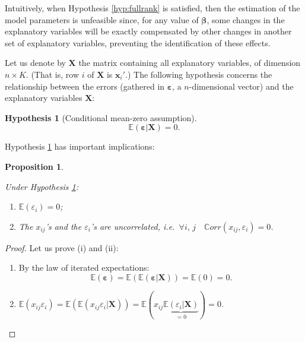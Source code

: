 \documentclass[
  12pt,
]{book}
\providecommand{\tightlist}{%
  \setlength{\itemsep}{0pt}\setlength{\parskip}{0pt}}
\newtheorem{proposition}{Proposition}[chapter]
\theoremstyle{definition}
\theoremstyle{definition}
\theoremstyle{definition}
\theoremstyle{definition}
\newtheorem{hypothesis}{Hypothesis}[chapter]
\theoremstyle{remark}
\begin{document}
Intuitively, when Hypothesis \ref{hyp:fullrank} is satisfied, then the estimation of the model parameters is unfeasible since, for any value of \(\boldsymbol\beta\), some changes in the explanatory variables will be exactly compensated by other changes in another set of explanatory variables, preventing the identification of these effects.

Let us denote by \(\mathbf{X}\) the matrix containing all explanatory variables, of dimension \(n \times K\). (That is, row \(i\) of \(\mathbf{X}\) is \(\mathbf{x}_i'\).) The following hypothesis concerns the relationship between the errors (gathered in \(\boldsymbol\varepsilon\), a \(n\)-dimensional vector) and the explanatory variables \(\mathbf{X}\):

\begin{hypothesis}[Conditional mean-zero assumption]
\protect\hypertarget{hyp:exogeneity}{}\label{hyp:exogeneity}\begin{equation}
\mathbb{E}(\boldsymbol\varepsilon|\mathbf{X}) = 0.
\end{equation}
\end{hypothesis}

Hypothesis \ref{hyp:exogeneity} has important implications:

\begin{proposition}
\protect\hypertarget{prp:implicationExog}{}\label{prp:implicationExog}

Under Hypothesis \ref{hyp:exogeneity}:

\begin{enumerate}
\def\labelenumi{\roman{enumi}.}
\tightlist
\item
  \(\mathbb{E}(\varepsilon_{i})=0\);
\item
  The \(x_{ij}\)'s and the \(\varepsilon_{i}\)'s are uncorrelated, i.e.~\(\forall i,\,j \quad \mathbb{C}orr(x_{ij},\varepsilon_{i})=0\).
\end{enumerate}

\end{proposition}

\begin{proof}

Let us prove (i) and (ii):

\begin{enumerate}
\def\labelenumi{\roman{enumi}.}
\tightlist
\item
  By the law of iterated expectations:
  \[
  \mathbb{E}(\boldsymbol\varepsilon)=\mathbb{E}(\mathbb{E}(\boldsymbol\varepsilon|\mathbf{X}))=\mathbb{E}(0)=0.
  \]
\item
  \(\mathbb{E}(x_{ij}\varepsilon_i)=\mathbb{E}(\mathbb{E}(x_{ij}\varepsilon_i|\mathbf{X}))=\mathbb{E}(x_{ij}\underbrace{\mathbb{E}(\varepsilon_i|\mathbf{X})}_{=0})=0\).
\end{enumerate}

\end{proof}
\end{document}
